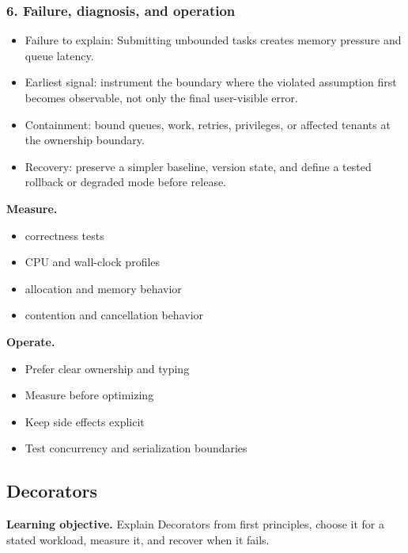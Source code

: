 \subsubsection*{6. Failure, diagnosis, and operation}
\begin{itemize}
\item Failure to explain: Submitting unbounded tasks creates memory pressure and queue latency.
\item Earliest signal: instrument the boundary where the violated assumption first becomes observable, not only the final user-visible error.
\item Containment: bound queues, work, retries, privileges, or affected tenants at the ownership boundary.
\item Recovery: preserve a simpler baseline, version state, and define a tested rollback or degraded mode before release.
\end{itemize}
\textbf{Measure.}\begin{itemize}
\item correctness tests
\item CPU and wall-clock profiles
\item allocation and memory behavior
\item contention and cancellation behavior
\end{itemize}
\textbf{Operate.}\begin{itemize}
\item Prefer clear ownership and typing
\item Measure before optimizing
\item Keep side effects explicit
\item Test concurrency and serialization boundaries
\end{itemize}
\subsection{Decorators}
\textbf{Learning objective.} Explain Decorators from first principles, choose it for a stated workload, measure it, and recover when it fails.
